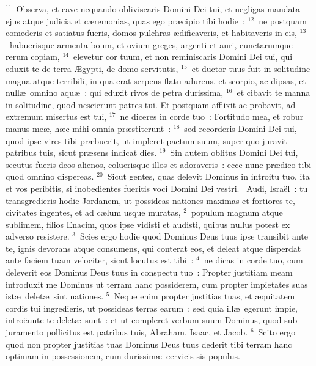 ${}^{11}$~Observa, et cave nequando obliviscaris Domini Dei tui, et negligas mandata ejus atque judicia et c\ae remonias, quas ego pr\ae cipio tibi hodie~:
${}^{12}$~ne postquam comederis et satiatus fueris, domos pulchras \ae dificaveris, et habitaveris in eis,
${}^{13}$~habuerisque armenta boum, et ovium greges, argenti et auri, cunctarumque rerum copiam,
${}^{14}$~elevetur cor tuum, et non reminiscaris Domini Dei tui, qui eduxit te de terra \AE gypti, de domo servitutis,
${}^{15}$~et ductor tuus fuit in solitudine magna atque terribili, in qua erat serpens flatu adurens, et scorpio, ac dipsas, et null\ae\ omnino aqu\ae~: qui eduxit rivos de petra durissima,
${}^{16}$~et cibavit te manna in solitudine, quod nescierunt patres tui. Et postquam afflixit ac probavit, ad extremum misertus est tui,
${}^{17}$~ne diceres in corde tuo~: Fortitudo mea, et robur manus me\ae , h\ae c mihi omnia pr\ae stiterunt~:
${}^{18}$~sed recorderis Domini Dei tui, quod ipse vires tibi pr\ae buerit, ut impleret pactum suum, super quo juravit patribus tuis, sicut pr\ae sens indicat dies.
${}^{19}$~Sin autem oblitus Domini Dei tui, secutus fueris deos alienos, coluerisque illos et adoraveris~: ecce nunc pr\ae dico tibi quod omnino dispereas.
${}^{20}$~Sicut gentes, quas delevit Dominus in introitu tuo, ita et vos peribitis, si inobedientes fueritis voci Domini Dei vestri.
~Audi, Isra\"el~: tu transgredieris hodie Jordanem, ut possideas nationes maximas et fortiores te, civitates ingentes, et ad c\ae lum usque muratas,
${}^{2}$~populum magnum atque sublimem, filios Enacim, quos ipse vidisti et audisti, quibus nullus potest ex adverso resistere.
${}^{3}$~Scies ergo hodie quod Dominus Deus tuus ipse transibit ante te, ignis devorans atque consumens, qui conterat eos, et deleat atque disperdat ante faciem tuam velociter, sicut locutus est tibi~:
${}^{4}$~ne dicas in corde tuo, cum deleverit eos Dominus Deus tuus in conspectu tuo~: Propter justitiam meam introduxit me Dominus ut terram hanc possiderem, cum propter impietates suas ist\ae\ delet\ae\ sint nationes.
${}^{5}$~Neque enim propter justitias tuas, et \ae quitatem cordis tui ingredieris, ut possideas terras earum~: sed quia ill\ae\ egerunt impie, intro\"eunte te delet\ae\ sunt~: et ut compleret verbum suum Dominus, quod sub juramento pollicitus est patribus tuis, Abraham, Isaac, et Jacob.
${}^{6}$~Scito ergo quod non propter justitias tuas Dominus Deus tuus dederit tibi terram hanc optimam in possessionem, cum durissim\ae\ cervicis sis populus.



